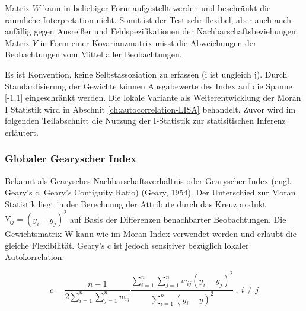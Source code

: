 Matrix $W$ kann in beliebiger Form aufgestellt werden und beschränkt die räumliche Interpretation nicht. 
Somit ist der Test sehr flexibel, aber auch auch anfällig gegen Ausreißer und Fehlspezifikationen der Nachbarschaftsbeziehungen. 
Matrix $Y$ in Form einer Kovarianzmatrix misst die Abweichungen der Beobachtungen vom Mittel aller Beobachtungen. \cite[S. 263]{fischer_handbook_2010}

Es ist Konvention, keine Selbstassoziation zu erfassen (i ist ungleich j). 
Durch Standardisierung der Gewichte können Ausgabewerte des Index auf die Spanne [-1,1] eingeschränkt werden. 
Die lokale Variante als Weiterentwicklung der Moran I Statistik wird in Abschnit \ref{ch:autocorrelation-LISA} behandelt.
Zuvor wird im folgenden Teilabschnitt die Nutzung der I-Statistik zur statisitischen Inferenz erläutert.






\subsubsection{Globaler Gearyscher Index}

Bekannt als Gearysches Nachbarschaftsverhältnis oder Gearyscher Index (engl. Geary’s c, Geary’s Contiguity Ratio) (Geary, 1954). \cite{geary_contiguity_1954} 
Der Unterschied zur Moran Statistik liegt in der Berechnung der Attribute durch das Kreuzprodukt $Y_{ij}=\left(y_i-y_j\right)^2$ auf Basis der Differenzen benachbarter Beobachtungen. 
Die Gewichtsmatrix W kann wie im Moran Index verwendet werden und erlaubt die gleiche Flexibilität. Geary's c ist jedoch sensitiver bezüglich lokaler Autokorrelation.

\begin{equation}
    c=\frac{n-1} {2 \sum_{i=1}^{n} \sum_{j=1}^{n} w_{ij}} 
        \frac{\sum_{i=1}^{n}\sum_{j=1}^{n} {w_{ij} \left(y_i-y_j\right)^2}} 
        {\sum_{i=1}^{n}\left(y_i-\bar{y}\right)^2} ~, ~ i\neq j
\end{equation}

